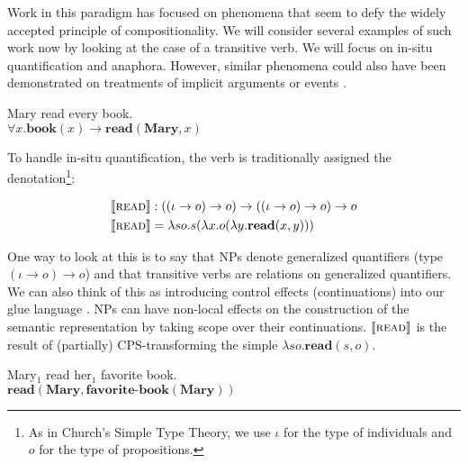 \documentclass{article}
\newcommand{\sem}[1]{\llbracket #1 \rrbracket}
\begin{document}
Work in this paradigm has focused on phenomena that seem to defy the widely
accepted principle of compositionality. We will consider several examples of
such work now by looking at the case of a transitive verb. We will focus on
in-situ quantification and anaphora. However, similar phenomena could also
have been demonstrated on treatments of implicit arguments
\citep{blom2012implicit} or events \citep{qian2011event}.


\begin{exe}
  \ex \label{ex:quantification} Mary read every book. \\
  $\forall x. \textbf{book}(x) \to \textbf{read}(\textbf{Mary}, x)$
\end{exe}

To handle in-situ quantification, the verb is traditionally assigned the
denotation\footnote{As in Church's Simple Type Theory, we use
  $\iota$ for the type of individuals and $o$ for the type of propositions.}:

\vspace{-4mm}

\begin{align*}
  \sem{\textsc{read}} & : ((\iota \to o) \to o) \to ((\iota \to o) \to o) \to
  o \\
  \sem{\textsc{read}} & = \lambda s o. s (\lambda x. o (\lambda
  y. \textbf{read}(x, y)))
\end{align*}

One way to look at this is to say that NPs denote generalized quantifiers
(type $(\iota \to o) \to o$) and that transitive verbs are relations on
generalized quantifiers. We can also think of this as introducing control
effects (continuations) into our glue language
\citep{barker2002continuations}. NPs can have non-local effects on the
construction of the semantic representation by taking scope over their
continuations. $\sem{\textsc{read}}$ is the result of (partially)
CPS-transforming the simple $\lambda s o. \textbf{read}(s, o)$.


\begin{exe}
  \ex \label{ex:anaphora} Mary$_1$ read her$_1$ favorite book. \\
  $\textbf{read}(\textbf{Mary}, \textbf{favorite-book}(\textbf{Mary}))$
\end{exe}
\end{document}
